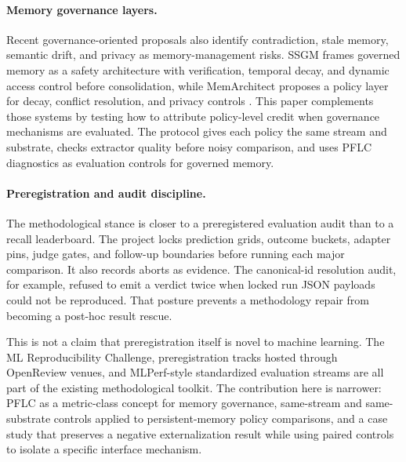 \paragraph{Memory governance layers.}
Recent governance-oriented proposals also identify contradiction, stale memory,
semantic drift, and privacy as memory-management risks. SSGM frames governed
memory as a safety architecture with verification, temporal decay, and dynamic
access control before consolidation, while MemArchitect proposes a policy layer
for decay, conflict resolution, and privacy controls
\cite{ssgm2026,memarchitect2026}. This paper complements those systems by
testing how to attribute policy-level credit when governance mechanisms are
evaluated. The protocol gives each policy the same stream and substrate, checks
extractor quality before noisy comparison, and uses PFLC diagnostics as
evaluation controls for governed memory.

\paragraph{Preregistration and audit discipline.}
The methodological stance is closer to a preregistered evaluation audit than to
a recall leaderboard. The project locks prediction grids, outcome buckets,
adapter pins, judge gates, and follow-up boundaries before running each major
comparison. It also records aborts as evidence. The canonical-id resolution
audit, for example, refused to emit a verdict twice when locked run JSON
payloads could not be reproduced. That posture prevents a methodology repair
from becoming a post-hoc result rescue.

This is not a claim that preregistration itself is novel to machine learning.
The ML Reproducibility Challenge, preregistration tracks hosted through
OpenReview venues, and MLPerf-style standardized evaluation streams are all
part of the existing methodological toolkit. The contribution here is narrower:
PFLC as a metric-class concept for memory governance, same-stream and
same-substrate controls applied to persistent-memory policy comparisons, and a
case study that preserves a negative externalization result while using paired
controls to isolate a specific interface mechanism.
